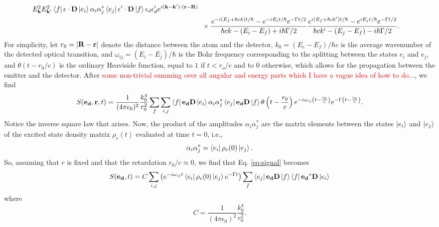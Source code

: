\documentclass[11pt]{article}
\newcommand{\al}{\alpha}
\newcommand{\f}[2]{\frac{#1}{#2}}
\newcommand{\lp}{\left(}
\newcommand{\rp}{\right)}
\begin{document}
\begin{appendices}
\begin{align}
E_\mathbf{k}^2 E_{\mathbf{k'}}^2  \bra{f} \mathbf{\epsilon}\cdot \mathbf{D} \ket{e_i}  \al_i\al_j^*  \bra{e_j} \mathbf{\epsilon'}\cdot \mathbf{D} \ket{f}  \epsilon_d \epsilon_d' e^{i(\mathbf{k-k'})\cdot (\mathbf{r} - \mathbf{R}  )}
\nonumber\\
&\,\,\,\times  
\f{e^{-i(E_f + \hbar c k)t/\hbar}  -e^{-iE_i t/\hbar}e^{-\Gamma t / 2}  }{\hbar c k - (E_i - E_f) + i\hbar \Gamma/2}
\f{e^{i(E_f + \hbar c k')t/\hbar}  - e^{iE_j t/\hbar}e^{-\Gamma t / 2}  }{\hbar c k' - (E_j - E_f) - i\hbar \Gamma/2}\nonumber.
\end{align}
For simplicity, let $r_0 = \abs{\mathbf{R}-\mathbf{r}}$ denote the distance between the atom and the detector, $k_0 = (E_e - E_f)/\hbar c$ is the average wavenumber of the detected optical transition, and $\omega_{ij} = (E_i - E_j)/\hbar$ is the Bohr frequency corresponding to the splitting between the states $e_i$ and $e_j$, and $\theta (t - r_0/c)$ is the ordinary Heaviside function, equal to $1$ if $t< r_o/c$ and to $0$ otherwise, which allows for the propagation between the emitter and the detector. After \textcolor{red}{some non-trivial summing over all angular and energy parts which I have a vague idea of how to do...}, we find 
\begin{equation}\label{eq:signal}
S(\mathbf{e_d}, \mathbf{r},t) = \f{1}{(4\pi\epsilon_0)^2}\f{k_0^4}{r_0^2}\sum_{f}\sum_{i,j} \bra{f}\mathbf{e_d}  \mathbf{D} \ket{e_i}\al_i \al_j^* \bra{e_j} \mathbf{e_d} \mathbf{D}\ket{f} \theta\lp t - \f{r_0}{c} \rp e^{-i \omega_{ij}\lp t-\f{r_0}{c} \rp } e^{-\Gamma\lp t-\f{r_0}{c} \rp }.
\end{equation}
Notice the inverse square law that arises. Now, the product of the amplitudes $\al_i \al_j^*$ are the matrix elements between the states $\ket{e_i}$ and $\ket{e_j}$ of the excited state density matrix $\rho_e(t)$ evaluated at time $t=0$, i.e., 
\begin{equation*}
\al_i \al_j^* = \bra{e_i} \rho_e(0) \ket{e_j}.
\end{equation*}
So, assuming that $r$ is fixed and that the retardation $r_0/c \approx 0$, we find that Eq. \ref{eq:signal} becomes
\begin{equation}\label{eq:full_signal}
S(\mathbf{e_d},t) = C\sum_{i,j}\lp e^{-i\omega_{ij}t} \bra{e_i}\rho_e(0)\ket{e_j} e^{-\Gamma t} \rp
\sum_f \bra{e_j}\mathbf{e_d} \mathbf{D}\ket{f}\bra{f}\mathbf{e_d}^*\mathbf{D}\ket{e_i}  
\end{equation}
where
\begin{equation*}
C = \f{1}{(4\pi\epsilon_0)^2}\f{k_0^4}{r_0^2}.

\end{equation*}
\end{appendices}
\end{document}
